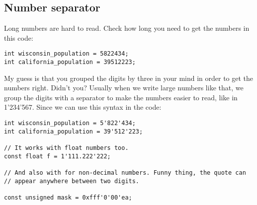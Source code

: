 \subsection{Number separator}
\label{number-separator}

Long numbers are hard to read. Check how long you need to get the
numbers in this  code:

\begin{lstlisting}
int wisconsin_population = 5822434;
int california_population = 39512223;
\end{lstlisting}

My guess is that you grouped the digits by three in your mind in order
to get the numbers right. Didn't you? Usually when we write large
numbers like that, we group the digits with a separator to make the
numbers easier to read, like in 1'234'567. Since  we can use
this syntax in the code:

\begin{lstlisting}
int wisconsin_population = 5'822'434;
int california_population = 39'512'223;

// It works with float numbers too.
const float f = 1'111.222'222;

// And also with for non-decimal numbers. Funny thing, the quote can
// appear anywhere between two digits.

const unsigned mask = 0xfff'0'00'ea;
\end{lstlisting}
